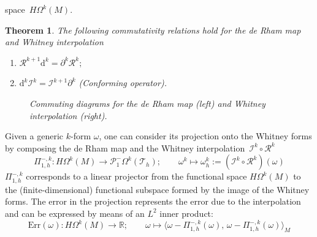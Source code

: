 \documentclass{elsarticle}
\newtheorem{theorem}{Theorem}
\renewcommand\d{\ensuremath{\mathrm{d}}}
\newcommand{\inpr}[3][]{\ensuremath{\langle #2, \, #3 \rangle_{#1}}}
\begin{document}
space~$H\Omega^k(M)$. 
\begin{theorem}\cite[Section IV.27]{whitney1957}\label{th:cd_RI}
The following commutativity relations hold for the de Rham map and Whitney interpolation 

\begin{enumerate}
\item $\mathcal{R}^{k+1} \d^k = \partial^k \mathcal{R}^k;$
\item $\d^k \mathcal{I}^k = \mathcal{I}^{k+1} \partial^k$ (Conforming operator).
\end{enumerate}
\begin{figure}[h]
\centering
{} \hspace{1cm}
\caption{Commuting diagrams for the de Rham map (left) and  Whitney interpolation (right).}
\label{fig:cd_RI}
\end{figure}

\end{theorem}

Given a generic $k$-form $\omega$, one can consider its projection onto the Whitney forms  by composing the de Rham map   and the Whitney interpolation~$\mathcal{I}^k \circ \mathcal{R}^k$~\cite{bochev2006}
\begin{equation}
\Pi_{1, h}^{-, k}:H\Omega^k(M) \rightarrow 
 \mathcal{P}^{-}_1\Omega^{k}(\mathcal{T}_h) 
; \qquad \omega^k \mapsto \omega_h^k:=(\mathcal{I}^k \circ \mathcal{R}^k )(\omega)
\end{equation}
$\Pi^{-, k}_{1, h}$ corresponds to a linear projector from the functional space $H\Omega^k(M) $ to the (finite-dimensional) functional subspace formed by the image of the Whitney forms. The error in the projection represents the error due to the interpolation and can be expressed by means of an $L^2$ inner product:
\begin{equation}\label{eq:L2err}
   \text{Err}(\omega):
H\Omega^k(M) \rightarrow \mathbb{R} ; \qquad 
\omega \mapsto \inpr[M]{\omega-\Pi_{1, h}^{-, k}(\omega)}{\omega-\Pi_{1, h}^{-, k}(\omega)} 
\end{equation}
\end{document}
